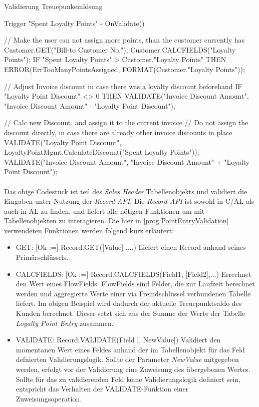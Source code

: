 \pagebreak

\begin{program}  %
	\caption{Validierung Treuepunkeinlösung}
	\label{prog:PointEntryValidation}
	\begin{JavaCode}
Trigger "Spent Loyalty Points" - OnValidate()

// Make the user can not assign more points, than the customer currently has
Customer.GET("Bill-to Customer No.");
Customer.CALCFIELDS("Loyalty Points");
IF "Spent Loyalty Points" > Customer."Loyalty Points" THEN
  ERROR(ErrTooManyPointsAssigned, FORMAT(Customer."Loyalty Points"));

// Adjust Invoice discount in case there was a loyalty discount beforehand
IF "Loyalty Point Discount" <> 0 THEN
  VALIDATE("Invoice Discount Amount", 
           "Invoice Discount Amount" - "Loyalty Point Discount");

// Calc new Discount, and assign it to the current invoice
// Do not assign the discount directly, in case there are already other invoice discounts in place
VALIDATE("Loyalty Point Discount", 
         LoyaltyPointMgmt.CalculateDiscount("Spent Loyalty Points"));
VALIDATE("Invoice Discount Amount", 
         "Invoice Discount Amount" + "Loyalty Point Discount");
	\end{JavaCode}
\end{program}

\paragraph{}
Das obige Codestück ist teil des \textit{Sales Header} Tabellenobjekts und validiert die Eingaben unter Nutzung der \textit{Record-API}. Die \textit{Record-API} ist sowohl in C/AL als auch in AL zu finden, und liefert alle nötigen Funktionen um mit Tabellenobjekten zu interagieren. Die hier in \ref{prog:PointEntryValidation} verwendeten Funktionen werden folgend kurz erläutert: 
\begin{itemize}
	\item GET: [Ok :=] Record.GET([Value] ,...) Liefert einen Record anhand seines Primärschlüssels.
	\item CALCFIELDS: [Ok :=] Record.CALCFIELDS(Field1, [Field2],...) Errechnet den Wert eines FlowFields. FlowFields sind Felder, die zur Laufzeit berechnet werden und aggregierte Werte einer via Fremdschlüssel verbundenen Tabelle liefert. Im obigen Beispiel wird dadurch der aktuelle Treuepunktsaldo des Kunden berechnet. Dieser setzt sich aus der Summe der Werte der Tabelle \textit{Loyalty Point Entry} zusammen.
	\item VALIDATE: Record.VALIDATE(Field [, NewValue]) Validiert den momentanen Wert eines Feldes anhand der im Tabellenobjekt für das Feld defnierten Validierungslogik. Sollte der Parameter \textit{NewValue} mitgegeben werden, erfolgt vor der Validierung eine Zuweisung des übergebenen Wertes. Sollte für das zu validierenden Feld keine Validierungslogik definiert sein, entspricht das Verhalten der VALIDATE-Funktion einer Zuweisungsoperation.
\end{itemize}

